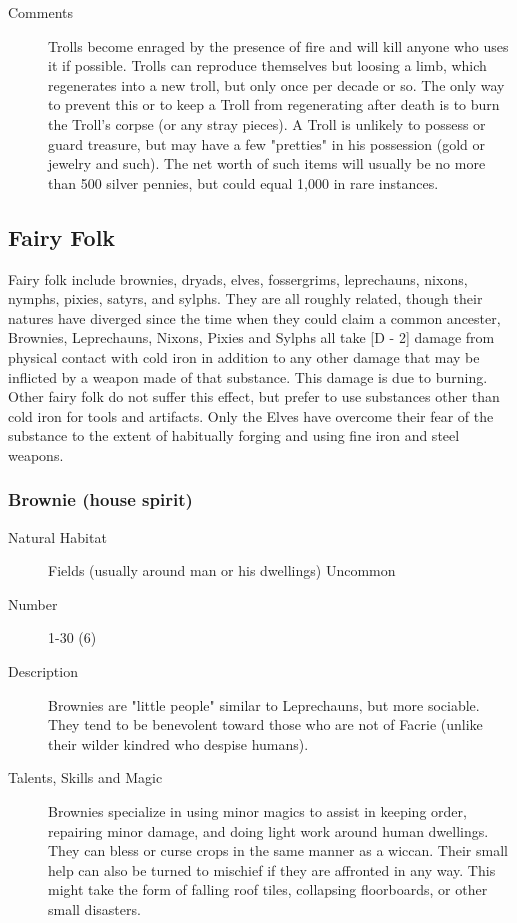 \begin{multicols}{2}
\begin{description}
\item[Comments] Trolls become enraged by the presence of fire and will kill
anyone who uses it if possible. Trolls can reproduce themselves but
loosing a limb, which regenerates into a new troll, but only once per
decade or so.  The only way to prevent this or to keep a Troll from
regenerating after death is to burn the Troll's corpse (or any stray
pieces).  A Troll is unlikely to possess or guard treasure, but may
have a few "pretties" in his possession (gold or jewelry and such).
The net worth of such items will usually be no more than 500 silver
pennies, but could equal 1,000 in rare instances.

\end{description}

\subsection{Fairy Folk}
Fairy folk include brownies, dryads, elves, fossergrims, leprechauns,
nixons, nymphs, pixies, satyrs, and sylphs.  They are all roughly
related, though their natures have diverged since the time when they
could claim a common ancester, Brownies, Leprechauns, Nixons, Pixies
and Sylphs all take [D - 2] damage from physical contact with cold
iron in addition to any other damage that may be inflicted by a weapon
made of that substance.  This damage is due to burning. Other fairy
folk do not suffer this effect, but prefer to use substances other
than cold iron for tools and artifacts. Only the Elves have overcome
their fear of the substance to the extent of habitually forging and
using fine iron and steel weapons.

\subsubsection{Brownie (house spirit)}

\begin{description}
\item[Natural Habitat] Fields (usually around man or his dwellings) Uncommon

\item[Number] 1-30 (6)

\item[Description] Brownies are "little people" similar to Leprechauns, but
more sociable. They tend to be benevolent toward those who are not of
Facrie (unlike their wilder kindred who despise humans).

\item[Talents, Skills and Magic] Brownies specialize in using minor magics to assist in
keeping order, repairing minor damage, and doing light work around
human dwellings. They can bless or curse crops in the same manner as a
wiccan. Their small help can also be turned to mischief if they are
affronted in any way. This might take the form of falling roof tiles,
collapsing floorboards, or other small disasters.


\end{description}
\end{multicols}
